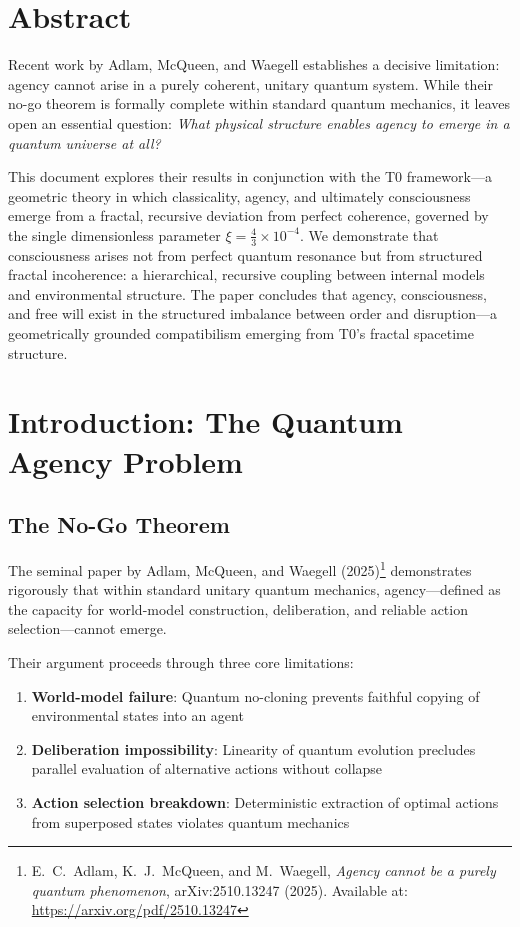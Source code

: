 \section*{Abstract}
		Recent work by Adlam, McQueen, and Waegell establishes a decisive limitation: agency cannot arise in a purely coherent, unitary quantum system. While their no-go theorem is formally complete within standard quantum mechanics, it leaves open an essential question: \emph{What physical structure enables agency to emerge in a quantum universe at all?}
		
		This document explores their results in conjunction with the T0 framework—a geometric theory in which classicality, agency, and ultimately consciousness emerge from a fractal, recursive deviation from perfect coherence, governed by the single dimensionless parameter $\xi = \frac{4}{3} \times 10^{-4}$. We demonstrate that consciousness arises not from perfect quantum resonance but from structured fractal incoherence: a hierarchical, recursive coupling between internal models and environmental structure. The paper concludes that agency, consciousness, and free will exist in the structured imbalance between order and disruption—a geometrically grounded compatibilism emerging from T0's fractal spacetime structure.

	
	
	
	
	\section{Introduction: The Quantum Agency Problem}
	
	\subsection{The No-Go Theorem}
	
	The seminal paper by Adlam, McQueen, and Waegell (2025)\footnote{E.~C.~Adlam, K.~J.~McQueen, and M.~Waegell, \emph{Agency cannot be a purely quantum phenomenon}, arXiv:2510.13247 (2025). Available at: \url{https://arxiv.org/pdf/2510.13247}} demonstrates rigorously that within standard unitary quantum mechanics, agency—defined as the capacity for world-model construction, deliberation, and reliable action selection—cannot emerge.
	
	Their argument proceeds through three core limitations:
	
	\begin{enumerate}
		\item \textbf{World-model failure}: Quantum no-cloning prevents faithful copying of environmental states into an agent
		\item \textbf{Deliberation impossibility}: Linearity of quantum evolution precludes parallel evaluation of alternative actions without collapse
		\item \textbf{Action selection breakdown}: Deterministic extraction of optimal actions from superposed states violates quantum mechanics
	\end{enumerate}
	
